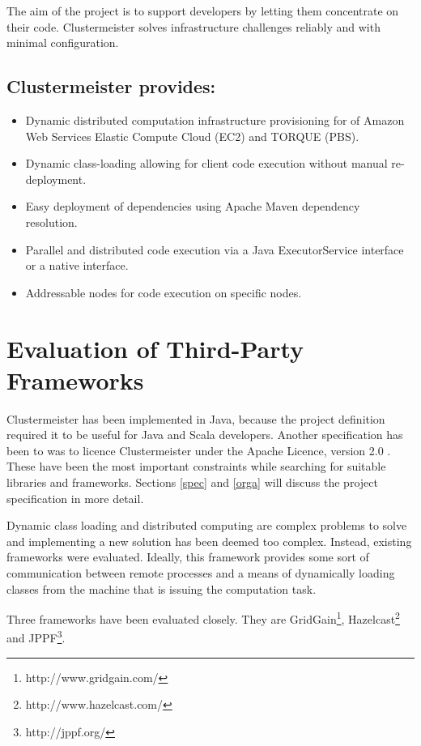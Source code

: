 \documentclass[english]{uzhpub}
\begin{document}
The aim of the project is to support developers by letting them concentrate on their code. Clustermeister solves infrastructure challenges reliably and with minimal configuration.

\subsection*{Clustermeister provides:}
\begin{itemize}
\item Dynamic distributed computation infrastructure provisioning for of Amazon Web Services Elastic Compute Cloud (EC2) and TORQUE (PBS).
\item Dynamic class-loading allowing for client code execution without manual re-deployment.
\item Easy deployment of dependencies using Apache Maven dependency resolution.
\item Parallel and distributed code execution via a Java ExecutorService interface or a native interface.
\item Addressable nodes for code execution on specific nodes.
\end{itemize}

\section{Evaluation of Third-Party Frameworks}

Clustermeister has been implemented in Java, because the project definition required it to be useful for Java and Scala developers. Another specification has been to was to licence Clustermeister under the Apache Licence, version 2.0 \cite{apache-license-2}. These have been the most important constraints while searching for suitable libraries and frameworks. Sections \ref{spec} and \ref{orga} will discuss the project specification in more detail.

Dynamic class loading and distributed computing are complex problems to solve and implementing a new solution has been deemed too complex. Instead, existing frameworks were evaluated. Ideally, this framework provides some sort of communication between remote processes and a means of dynamically loading classes from the machine that is issuing the computation task.

Three frameworks have been evaluated closely. They are 
GridGain\footnote{http://www.gridgain.com/}, Hazelcast\footnote{http://www.hazelcast.com/} and JPPF\footnote{http://jppf.org/}.
\end{document}
